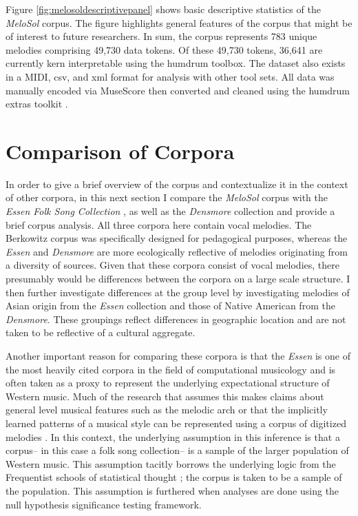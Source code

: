 \documentclass[12pt,]{book}
\begin{document}
Figure \ref{fig:melosoldescriptivepanel} shows basic descriptive statistics of the \emph{MeloSol} corpus.
The figure highlights general features of the corpus that might be of interest to future researchers.
In sum, the corpus represents 783 unique melodies comprising 49,730 data tokens.
Of these 49,730 tokens, 36,641 are currently kern interpretable using the humdrum toolbox.
The dataset also exists in a MIDI, csv, and xml format for analysis with other tool sets.
All data was manually encoded via MuseScore then converted and cleaned using the humdrum extras toolkit \citep{sappHumdrumExtras2008, wernerMuseScore2019}.

\hypertarget{comparison-of-corpora}{%
\section{Comparison of Corpora}\label{comparison-of-corpora}}

In order to give a brief overview of the corpus and contextualize it in the context of other corpora, in this next section I compare the \emph{MeloSol} corpus with the \emph{Essen Folk Song Collection} \citep{schaffrathEssenFolkSong1995}, as well as the \emph{Densmore} collection \citep{shanahanDENSMORECOLLECTIONNATIVE2014} and provide a brief corpus analysis.
All three corpora here contain vocal melodies.
The Berkowitz corpus was specifically designed for pedagogical purposes, whereas the \emph{Essen} and \emph{Densmore} are more ecologically reflective of melodies originating from a diversity of sources.
Given that these corpora consist of vocal melodies, there presumably would be differences between the corpora on a large scale structure.
I then further investigate differences at the group level by investigating melodies of Asian origin from the \emph{Essen} collection and those of Native American from the \emph{Densmore}.
These groupings reflect differences in geographic location and are not taken to be reflective of a cultural aggregate.

Another important reason for comparing these corpora is that the \emph{Essen} is one of the most heavily cited corpora in the field of computational musicology and is often taken as a proxy to represent the underlying expectational structure of Western music.
Much of the research that assumes this makes claims about general level musical features such as the melodic arch \citep{huronMelodicArchWestern1996, shanahanExaminingEffectOral2019} or that the implicitly learned patterns of a musical style can be represented using a corpus of digitized melodies \citep{demorestQuantifyingCulture2015, pearceStatisticalLearningProbabilistic2018a}.
In this context, the underlying assumption in this inference is that a corpus-- in this case a folk song collection-- is a sample of the larger population of Western music.
This assumption tacitly borrows the underlying logic from the Frequentist schools of statistical thought \citep{dienesUnderstandingPsychologyScience2008}; the corpus is taken to be a sample of the population.
This assumption is furthered when analyses are done using the null hypothesis significance testing framework.
\end{document}

